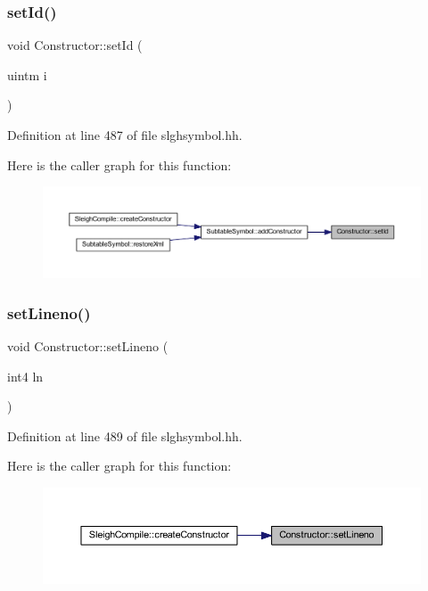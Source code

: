 \subsubsection{\texorpdfstring{setId()}{setId()}}
{\footnotesize\ttfamily void Constructor\+::set\+Id (\begin{DoxyParamCaption}\item[{uintm}]{i }\end{DoxyParamCaption})\hspace{0.3cm}{\ttfamily [inline]}}



Definition at line 487 of file slghsymbol.\+hh.

Here is the caller graph for this function\+:
\nopagebreak
\begin{figure}[H]
\begin{center}
\leavevmode
\includegraphics[width=350pt]{class_constructor_a62e79d4c17ff80718c9a7d8ad58f1c08_icgraph}
\end{center}
\end{figure}
\mbox{\label{class_constructor_a4c6232d9e2bc08dd4a5fea7314dce4e9}} 
\subsubsection{\texorpdfstring{setLineno()}{setLineno()}}
{\footnotesize\ttfamily void Constructor\+::set\+Lineno (\begin{DoxyParamCaption}\item[{int4}]{ln }\end{DoxyParamCaption})\hspace{0.3cm}{\ttfamily [inline]}}



Definition at line 489 of file slghsymbol.\+hh.

Here is the caller graph for this function\+:
\nopagebreak
\begin{figure}[H]
\begin{center}
\leavevmode
\includegraphics[width=350pt]{class_constructor_a4c6232d9e2bc08dd4a5fea7314dce4e9_icgraph}
\end{center}
\end{figure}
\mbox{\label{class_constructor_ab57dc6ff30aa37f1bc63d156edb42ae6}} 
